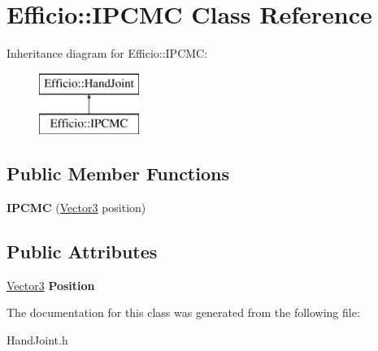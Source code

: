 \hypertarget{class_efficio_1_1_i_p_c_m_c}{}\section{Efficio\+:\+:I\+P\+C\+MC Class Reference}
\label{class_efficio_1_1_i_p_c_m_c}
Inheritance diagram for Efficio\+:\+:I\+P\+C\+MC\+:\begin{figure}[H]
\begin{center}
\leavevmode
\includegraphics[height=2.000000cm]{class_efficio_1_1_i_p_c_m_c}
\end{center}
\end{figure}
\subsection*{Public Member Functions}
\begin{DoxyCompactItemize}
\item 
{\bfseries I\+P\+C\+MC} (\hyperlink{class_efficio_1_1_vector3}{Vector3} position)\hypertarget{class_efficio_1_1_i_p_c_m_c_ab4ad858afbf608d28032acf561643a4c}{}\label{class_efficio_1_1_i_p_c_m_c_ab4ad858afbf608d28032acf561643a4c}

\end{DoxyCompactItemize}
\subsection*{Public Attributes}
\begin{DoxyCompactItemize}
\item 
\hyperlink{class_efficio_1_1_vector3}{Vector3} {\bfseries Position}\hypertarget{class_efficio_1_1_i_p_c_m_c_a6963fba7ee73bcf5363a85b4ad6d2dbd}{}\label{class_efficio_1_1_i_p_c_m_c_a6963fba7ee73bcf5363a85b4ad6d2dbd}

\end{DoxyCompactItemize}


The documentation for this class was generated from the following file\+:\begin{DoxyCompactItemize}
\item 
Hand\+Joint.\+h\end{DoxyCompactItemize}
